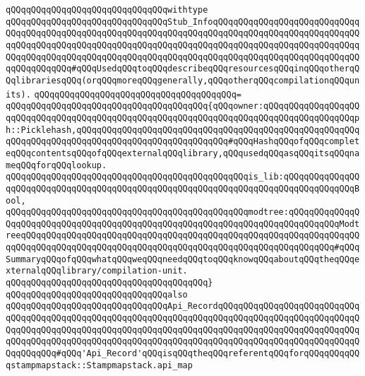 \newline
\newline
\newline
\verb|qQQqqQQqqQQqqQQqqQQqqQQqqQQqqQQqwithtype|\newline
\verb|qQQqqQQqqQQqqQQqqQQqqQQqqQQqqQQqStub_InfoqQQqqQQqqQQqqQQqqQQqqQQqqQQqqQQqqQQqqQQqqQQqqQQqqQQqqQQqqQQqqQQqqQQqqQQqqQQqqQQqqQQqqQQqqQQqqQQqqQQqqQQqqQQqqQQqqQQqqQQqqQQqqQQqqQQqqQQqqQQqqQQqqQQqqQQqqQQqqQQqqQQqqQQqqQQqqQQqqQQqqQQqqQQqqQQqqQQqqQQqqQQqqQQqqQQqqQQqqQQqqQQqqQQqqQQqqQQqqQQqqQQqqQQqqQQq#qQQqUsedqQQqtoqQQqdescribeqQQqresourcesqQQqinqQQqotherqQQqlibrariesqQQq(orqQQqmoreqQQqgenerally,qQQqotherqQQqcompilationqQQqunits).|\newline
\verb|qQQqqQQqqQQqqQQqqQQqqQQqqQQqqQQqqQQqqQQq=|\newline
\verb|qQQqqQQqqQQqqQQqqQQqqQQqqQQqqQQqqQQqqQQq{qQQqowner:qQQqqQQqqQQqqQQqqQQqqQQqqQQqqQQqqQQqqQQqqQQqqQQqqQQqqQQqqQQqqQQqqQQqqQQqqQQqqQQqqQQqqQQqph::Picklehash,qQQqqQQqqQQqqQQqqQQqqQQqqQQqqQQqqQQqqQQqqQQqqQQqqQQqqQQqqQQqqQQqqQQqqQQqqQQqqQQqqQQqqQQqqQQqqQQqqQQq#qQQqHashqQQqofqQQqcompleteqQQqcontentsqQQqofqQQqexternalqQQqlibrary,qQQqusedqQQqasqQQqitsqQQqnameqQQqforqQQqlookup.|\newline
\verb|qQQqqQQqqQQqqQQqqQQqqQQqqQQqqQQqqQQqqQQqqQQqqQQqis_lib:qQQqqQQqqQQqqQQqqQQqqQQqqQQqqQQqqQQqqQQqqQQqqQQqqQQqqQQqqQQqqQQqqQQqqQQqqQQqqQQqqQQqBool,|\newline
\verb|qQQqqQQqqQQqqQQqqQQqqQQqqQQqqQQqqQQqqQQqqQQqqQQqmodtree:qQQqqQQqqQQqqQQqqQQqqQQqqQQqqQQqqQQqqQQqqQQqqQQqqQQqqQQqqQQqqQQqqQQqqQQqqQQqqQQqModtreeqQQqqQQqqQQqqQQqqQQqqQQqqQQqqQQqqQQqqQQqqQQqqQQqqQQqqQQqqQQqqQQqqQQqqQQqqQQqqQQqqQQqqQQqqQQqqQQqqQQqqQQqqQQqqQQqqQQqqQQqqQQqqQQqqQQq#qQQqSummaryqQQqofqQQqwhatqQQqweqQQqneedqQQqtoqQQqknowqQQqaboutqQQqtheqQQqexternalqQQqlibrary/compilation-unit.|\newline
\verb|qQQqqQQqqQQqqQQqqQQqqQQqqQQqqQQqqQQqqQQq}|\newline
\newline
\newline
\newline
\verb|qQQqqQQqqQQqqQQqqQQqqQQqqQQqqQQqalso|\newline
\verb|qQQqqQQqqQQqqQQqqQQqqQQqqQQqqQQqApi_RecordqQQqqQQqqQQqqQQqqQQqqQQqqQQqqQQqqQQqqQQqqQQqqQQqqQQqqQQqqQQqqQQqqQQqqQQqqQQqqQQqqQQqqQQqqQQqqQQqqQQqqQQqqQQqqQQqqQQqqQQqqQQqqQQqqQQqqQQqqQQqqQQqqQQqqQQqqQQqqQQqqQQqqQQqqQQqqQQqqQQqqQQqqQQqqQQqqQQqqQQqqQQqqQQqqQQqqQQqqQQqqQQqqQQqqQQqqQQqqQQqqQQqqQQq#qQQq'Api_Record'qQQqisqQQqtheqQQqreferentqQQqforqQQqqQQqqQQqstampmapstack::Stampmapstack.api_map|\newline
